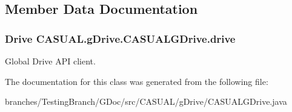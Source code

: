 \subsection{Member Data Documentation}
\hypertarget{classCASUAL_1_1gDrive_1_1CASUALGDrive_ae4c31951e931fb6eeafc818873646451}{
\subsubsection[{drive}]{\setlength{\rightskip}{0pt plus 5cm}Drive C\-A\-S\-U\-A\-L.\-g\-Drive.\-C\-A\-S\-U\-A\-L\-G\-Drive.\-drive\hspace{0.3cm}{\ttfamily [static]}}}\label{classCASUAL_1_1gDrive_1_1CASUALGDrive_ae4c31951e931fb6eeafc818873646451}
Global Drive A\-P\-I client. 

The documentation for this class was generated from the following file\-:\begin{DoxyCompactItemize}
\item 
branches/\-Testing\-Branch/\-G\-Doc/src/\-C\-A\-S\-U\-A\-L/g\-Drive/C\-A\-S\-U\-A\-L\-G\-Drive.\-java\end{DoxyCompactItemize}
